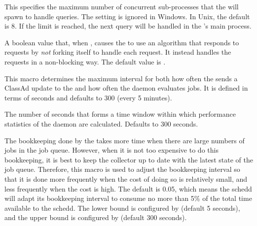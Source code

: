 \begin{description}
\label{param:ScheddQueryWorkers}
\item[\Macro{SCHEDD\_QUERY\_WORKERS}]
  This specifies the maximum number of concurrent sub-processes that
  the  will spawn to handle queries.  The setting is
  ignored in Windows.  In Unix, the default is 8.  If the limit is
  reached, the next query will be handled in the 's main
  process.

\label{param:CondorQUseV3Protocol}
\item[\Macro{CONDOR\_Q\_USE\_V3\_PROTOCOL}]
  A boolean value that, when ,
  causes the  to use an algorithm that responds to 
   requests by \emph{not} forking itself to handle each request.
  It instead handles the requests in a non-blocking way.
  The default value is .

\label{param:ScheddInterval}
\item[\Macro{SCHEDD\_INTERVAL}]
  This macro determines the maximum interval for both how often the
   sends a ClassAd update to the  and
  how often the  daemon evaluates jobs.  It is defined
  in terms of seconds and defaults to 300 (every 5 minutes).

\label{param:WindowedStatWidth}
\item[\Macro{WINDOWED\_STAT\_WIDTH}]
  The number of seconds that forms a time window within which performance
  statistics of the  daemon are calculated.
  Defaults to 300 seconds.

\label{param:ScheddIntervalTimeslice}
\item[\Macro{SCHEDD\_INTERVAL\_TIMESLICE}]
  The bookkeeping done by the
   takes more time when there are large numbers of jobs
  in the job queue.  However, when it is not too expensive to do this
  bookkeeping, it is best to keep the collector up to date with the
  latest state of the job queue.  Therefore, this macro is used to
  adjust the bookkeeping interval so that it is done more frequently
  when the cost of doing so is relatively small, and less frequently
  when the cost is high.  The default is 0.05, which means the schedd
  will adapt its bookkeeping interval to consume no more than 5\% of the
  total time available to the schedd.  The lower bound is configured by
   (default 5 seconds), and the upper bound
  is configured by  (default 300 seconds).




\end{description}
